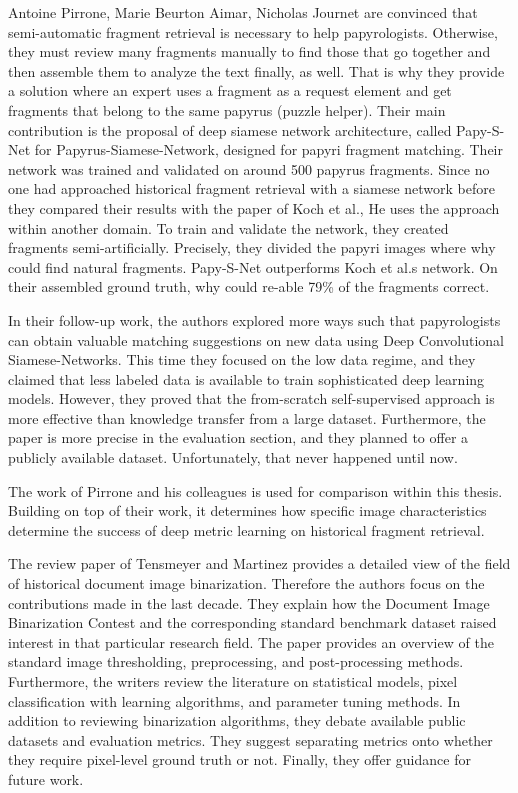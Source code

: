 Antoine Pirrone, Marie Beurton Aimar, Nicholas Journet are convinced that semi-automatic fragment retrieval is necessary to help papyrologists. Otherwise, they must review many fragments manually to find those that go together and then assemble them to analyze the text finally, as well. That is why they provide a solution where an expert uses a fragment as a request element and get fragments that belong to the same papyrus (puzzle helper). Their main contribution is the proposal of deep siamese network architecture, called Papy-S-Net for Papyrus-Siamese-Network, designed for papyri fragment matching. Their network was trained and validated on around 500 papyrus fragments. Since no one had approached historical fragment retrieval with a siamese network before they compared their results with the paper of Koch et al., He uses the approach within another domain. To train and validate the network, they created fragments semi-artificially. Precisely, they divided the papyri images where why could find natural fragments. Papy-S-Net outperforms Koch et al.s network. On their assembled ground truth, why could re-able 79\% of the fragments correct. 

In their follow-up work, the authors explored more ways such that papyrologists can obtain valuable matching suggestions on new data using Deep Convolutional Siamese-Networks. This time they focused on the low data regime, and they claimed that less labeled data is available to train sophisticated deep learning models. However, they proved that the from-scratch self-supervised approach is more effective than knowledge transfer from a large dataset. Furthermore, the paper is more precise in the evaluation section, and they planned to offer a publicly available dataset. Unfortunately, that never happened until now. 

The work of Pirrone and his colleagues is used for comparison within this thesis. Building on top of their work, it determines how specific image characteristics determine the success of deep metric learning on historical fragment retrieval. 

The review paper of Tensmeyer and Martinez provides a detailed view of the field of historical document image binarization. Therefore the authors focus on the contributions made in the last decade. They explain how the Document Image Binarization Contest and the corresponding standard benchmark dataset raised interest in that particular research field. The paper provides an overview of the standard image thresholding, preprocessing, and post-processing methods. Furthermore, the writers review the literature on statistical models, pixel classification with learning algorithms, and parameter tuning methods. In addition to reviewing binarization algorithms, they debate available public datasets and evaluation metrics. They suggest separating metrics onto whether they require pixel-level ground truth or not. Finally, they offer guidance for future work. 



